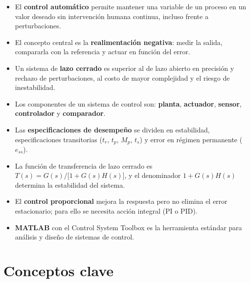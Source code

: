 \begin{itemize}
  \item El \textbf{control automático} permite mantener una variable de un
    proceso en un valor deseado sin intervención humana continua, incluso
    frente a perturbaciones.
  \item El concepto central es la \textbf{realimentación negativa}: medir
    la salida, compararla con la referencia y actuar en función del error.
  \item Un sistema de \textbf{lazo cerrado} es superior al de lazo abierto
    en precisión y rechazo de perturbaciones, al costo de mayor complejidad
    y el riesgo de inestabilidad.
  \item Los componentes de un sistema de control son: \textbf{planta},
    \textbf{actuador}, \textbf{sensor}, \textbf{controlador} y \textbf{comparador}.
  \item Las \textbf{especificaciones de desempeño} se dividen en estabilidad,
    especificaciones transitorias ($t_r$, $t_p$, $M_p$, $t_s$) y error
    en régimen permanente ($e_{ss}$).
  \item La función de transferencia de lazo cerrado es
    $T(s) = G(s)/\bigl[1 + G(s)H(s)\bigr]$, y el denominador $1 + G(s)H(s)$
    determina la estabilidad del sistema.
  \item El \textbf{control proporcional} mejora la respuesta pero no elimina
    el error estacionario; para ello se necesita acción integral (PI o PID).
  \item \textbf{MATLAB} con el Control System Toolbox es la herramienta
    estándar para análisis y diseño de sistemas de control.
\end{itemize}

\section{Conceptos clave}
\label{sec:intro-conceptos}

